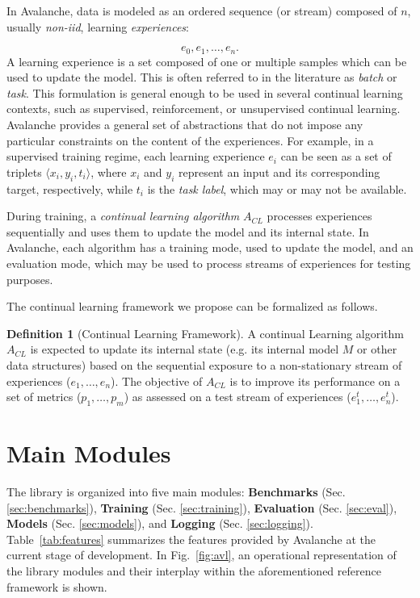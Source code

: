 \documentclass[final]{cvpr}
\theoremstyle{definition}
\newtheorem*{definition}{Definition}
\begin{document}
In Avalanche, data is modeled as an ordered sequence (or stream) composed of $n$, usually \emph{non-iid}, learning \emph{experiences}: 

\begin{equation*}
    e_0, e_1, \dots, e_n.
\end{equation*}
A learning experience is a set composed of one or multiple samples which can be used to update the model. This is often referred to in the literature as \emph{batch} or \emph{task}. 
This formulation is general enough to be used in several continual learning contexts, such as supervised, reinforcement, or unsupervised continual learning. Avalanche provides a general set of abstractions that do not impose any particular constraints on the content of the experiences. For example, in a supervised training regime, each learning experience $e_i$ can be seen as a set of triplets $\langle x_i, y_i, t_i \rangle$, where $x_i$ and $y_i$ represent an input and its corresponding target, respectively, while $t_i$ is the \emph{task label}, which may or may not be available. 

During training, a \emph{continual learning algorithm} $A_{CL}$ processes experiences sequentially and uses them to update the model and its internal state. In Avalanche, each algorithm has a training mode, used to update the model, and an evaluation mode, which may be used to process streams of experiences for testing purposes.

The continual learning framework we propose can be formalized as follows. 

\begin{definition}[Continual Learning Framework]
A continual Learning algorithm $A_{CL}$ is expected to update its internal state (e.g. its internal model $M$ or other data structures) based on the sequential
exposure to a non-stationary stream of experiences ($e_1, \dots, e_n$). The objective of $A_{CL}$ is to improve its performance on a set of metrics ($p_1,\dots,p_m$) as assessed on a test stream of experiences ($e_1^{t}, \dots, e_n^t$). 
\end{definition}

\section{Main Modules}
\label{sec:modules}

The library is organized into five main modules: \textbf{Benchmarks} (Sec. \ref{sec:benchmarks}), \textbf{Training} (Sec. \ref{sec:training}), \textbf{Evaluation} (Sec. \ref{sec:eval}), \textbf{Models} (Sec. \ref{sec:models}), and \textbf{Logging} (Sec. \ref{sec:logging}). %
Table~\ref{tab:features} summarizes the features provided by Avalanche at the current stage of development. In Fig.~\ref{fig:avl}, an operational representation of the library modules and their interplay within the aforementioned reference framework is shown.
\end{document}
